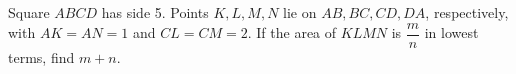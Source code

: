 Square $ABCD$ has side 5. Points $K,L,M,N$ lie on $AB,BC,CD,DA$, respectively, with $AK=AN=1$ and $CL=CM=2$. If the area of $KLMN$ is $\dfrac{m}{n}$ in lowest terms, find $m+n$.
